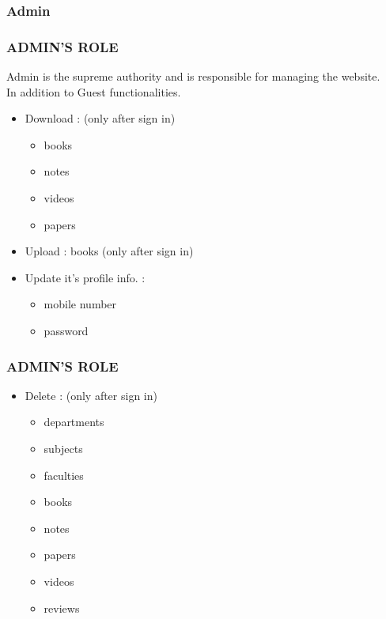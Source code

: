 \documentclass{beamer}
\begin{document}
\subsubsection{Admin}
\begin{frame}\frametitle{ADMIN'S ROLE}
\begin{block}{}
\textrm \textrm Admin is the supreme authority and is responsible for managing the website.\\
In addition to Guest functionalities.
	\begin{itemize}
		\item \textrm Download : (only after sign in)
\begin{itemize}
\item books
\item notes
\item videos
\item papers
\end{itemize}
		\item \textrm Upload : books (only after sign in)

		\item \textrm Update it's profile info. :
\begin{itemize}
\item mobile number
\item password
\end{itemize}
	\end{itemize}
\end{block}
\end{frame}


\begin{frame}\frametitle{ADMIN'S ROLE}
\begin{block}{}
	\begin{itemize}
		\item \textrm Delete : (only after sign in)
\begin{itemize}
\item departments
\item subjects
\item faculties
\item books
\item notes
\item papers
\item videos
\item reviews
\end{itemize}
	\end{itemize}
\end{block}
\end{frame}
\end{document}
